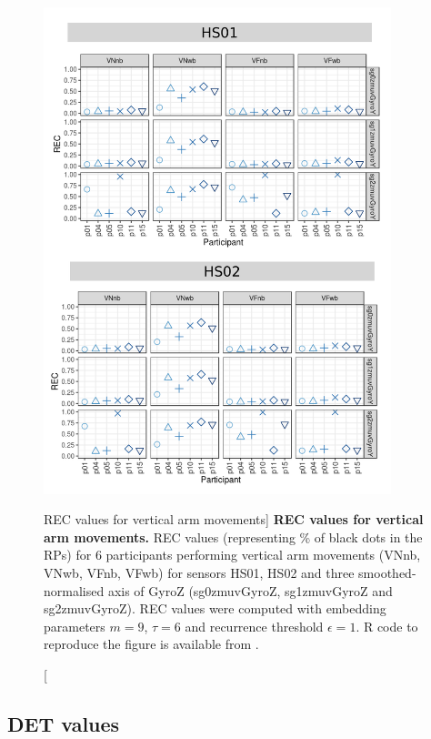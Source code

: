 \begin{figure}
\centering
\includegraphics[width=0.9\textwidth]{rqa_rec_V_w500}
    \caption
	[REC values for vertical arm movements]{
	{\bf REC values for vertical arm movements.}
	REC values (representing \% of black dots in the RPs) for 
	6 participants performing vertical arm movements 
	(VNnb, VNwb, VFnb, VFwb)
	for sensors HS01, HS02 and three smoothed-normalised axis 
	of GyroZ (sg0zmuvGyroZ, sg1zmuvGyroZ and sg2zmuvGyroZ).
	REC values were computed with 
	embedding parameters $m=9$, $\tau=6$ and recurrence threshold
	$\epsilon=1$.
	R code to reproduce the figure is available from \cite{hwum2018}.
        }
    \label{fig:rqa_rec_V}
\end{figure}


\newpage
\subsection{DET values}

